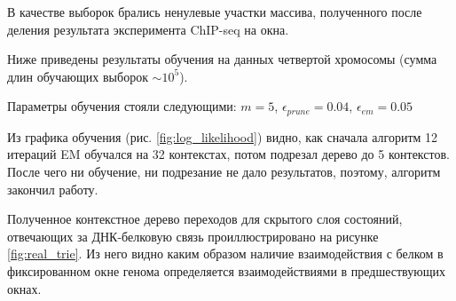 \documentclass{matmex-diploma-custom}
\begin{document}
В качестве выборок брались ненулевые участки массива, полученного после деления результата эксперимента ChIP-seq на окна.  

Ниже приведены результаты обучения на данных четвертой хромосомы (сумма длин обучающих выборок $\sim 10^5$).

Параметры обучения стояли следующими:
$m = 5$, $\epsilon_{\textit{prune}} = 0.04$, $\epsilon_{\textit{em}} = 0.05$

Из графика обучения (рис. \ref{fig:log_likelihood}) видно, как сначала алгоритм 12 итераций EM обучался на 32 контекстах, потом подрезал дерево до 5 контекстов. После чего ни обучение, ни подрезание не дало результатов, поэтому, алгоритм закончил работу.

Полученное контекстное дерево переходов для скрытого слоя состояний, отвечающих за ДНК-белковую связь проиллюстрировано на рисунке \ref{fig:real_trie}. Из него видно каким образом наличие взаимодействия с белком в фиксированном окне генома определяется взаимодействиями в предшествующих окнах.
\end{document}
